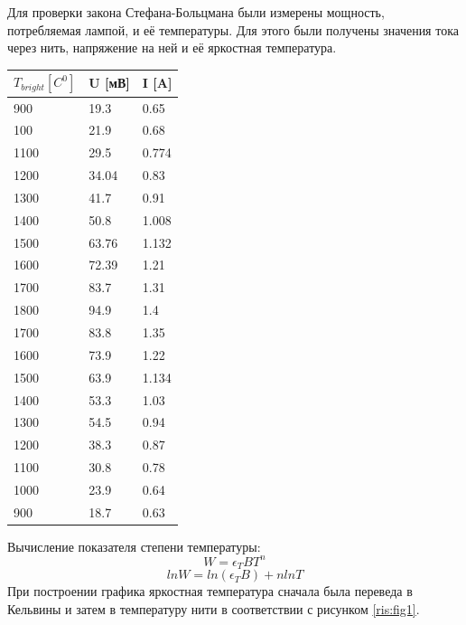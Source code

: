 \documentclass[a4paper,12pt]{article} %
\begin{document}
			Для проверки закона Стефана-Больцмана были измерены мощность, потребляемая лампой, и её температуры. 
			Для этого были получены значения тока через нить, напряжение на ней и её яркостная температура.\par		
			\begin{table}[h!]
				\centering
				\begin{tabular}{|l|l|l|}
				\hline
				$T_{bright} [C^{0}]$				  & U [мВ] & I [A]     \\ \hline
				900                                   & 19.3       & 0.65  \\ \hline
				100                                   & 21.9       & 0.68  \\ \hline
				1100                                  & 29.5       & 0.774 \\ \hline
				1200                                  & 34.04      & 0.83  \\ \hline
				1300                                  & 41.7       & 0.91  \\ \hline
				1400                                  & 50.8       & 1.008 \\ \hline
				1500                                  & 63.76      & 1.132 \\ \hline
				1600                                  & 72.39      & 1.21  \\ \hline
				1700                                  & 83.7       & 1.31  \\ \hline
				1800                                  & 94.9       & 1.4   \\ \hline
				1700                                  & 83.8       & 1.35  \\ \hline
				1600                                  & 73.9       & 1.22  \\ \hline
				1500                                  & 63.9       & 1.134 \\ \hline
				1400                                  & 53.3       & 1.03  \\ \hline
				1300                                  & 54.5       & 0.94  \\ \hline
				1200                                  & 38.3       & 0.87  \\ \hline
				1100                                  & 30.8       & 0.78  \\ \hline
				1000                                  & 23.9       & 0.64  \\ \hline
				900                                   & 18.7       & 0.63  \\ \hline
				\end{tabular}
			\end{table}
			Вычисление показателя степени температуры:
			\begin{equation}
				W = \epsilon_TBT^n
			\end{equation}
			\begin{equation}
				ln{W} = ln(\epsilon_TB) + n ln{T}
			\end{equation}
			При построении графика яркостная температура сначала была переведа в Кельвины и затем в температуру нити в соответствии с рисунком \ref{ris:fig1}.
	\newpage
\end{document}
